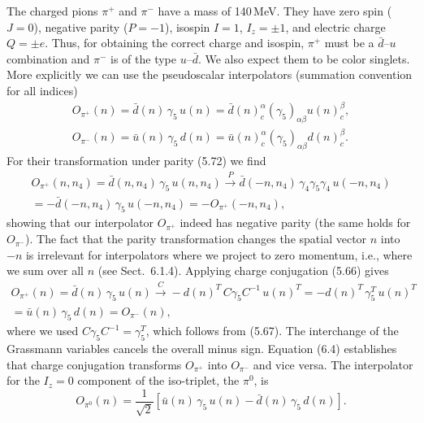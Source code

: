 The charged pions $\pi^+$ and $\pi^-$ have a mass of 140\,MeV. They have zero
spin ($J = 0$), negative parity ($P = -1$), isospin $I = 1$, $I_z = \pm 1$, and
electric charge $Q = \pm e$. Thus, for obtaining the correct charge and
isospin, $\pi^+$ must be a $\bar d$--$u$ combination and $\pi^-$ is of the type
$u$--$\bar d$. We also expect them to be color singlets. More explicitly we can
use the pseudoscalar interpolators (summation convention for all indices)
\begin{equation}
  \begin{gathered}
    O_{\pi^+}(n) = \bar d(n)\, \gamma_5\, u(n)
      = \bar d(n)^\alpha_c (\gamma_5)_{\alpha\beta} u(n)^\beta_c , \\
    O_{\pi^-}(n) = \bar u(n)\, \gamma_5\, d(n)
      = \bar u(n)^\alpha_c (\gamma_5)_{\alpha\beta} d(n)^\beta_c .
  \end{gathered}
\end{equation}
For their transformation under parity (5.72) we find
\begin{multline}
  O_{\pi^+}(n, n_4) = \bar d(n, n_4)\, \gamma_5\, u(n, n_4)
  \xrightarrow{\;P\;}
  \bar d(-n, n_4)\, \gamma_4\gamma_5\gamma_4\, u(-n, n_4) \\
  = -\bar d(-n, n_4)\, \gamma_5\, u(-n, n_4)
  = -O_{\pi^+}(-n, n_4) ,
\end{multline}
showing that our interpolator $O_{\pi^+}$ indeed has negative parity (the same
holds for $O_{\pi^-}$). The fact that the parity transformation changes the
spatial vector $n$ into $-n$ is irrelevant for interpolators where we project
to zero momentum, i.e., where we sum over all $n$ (see Sect.~6.1.4). Applying
charge conjugation (5.66) gives
\begin{multline}
  O_{\pi^+}(n) = \bar d(n)\, \gamma_5\, u(n)
  \xrightarrow{\;C\;}
  -d(n)^T\, C\gamma_5 C^{-1}\, u(n)^T
  = -d(n)^T\, \gamma_5^T\, u(n)^T \\
  = \bar u(n)\, \gamma_5\, d(n) = O_{\pi^-}(n) ,
\end{multline}
where we used $C\gamma_5 C^{-1} = \gamma_5^T$, which follows from (5.67). The
interchange of the Grassmann variables cancels the overall minus sign. Equation
(6.4) establishes that charge conjugation transforms $O_{\pi^+}$ into
$O_{\pi^-}$ and vice versa. The interpolator for the $I_z = 0$ component of the
iso-triplet, the $\pi^0$, is
\begin{equation}
  O_{\pi^0}(n) = \frac{1}{\sqrt{2}}\left[ \bar u(n)\, \gamma_5\, u(n)
    - \bar d(n)\, \gamma_5\, d(n) \right].
\end{equation}

